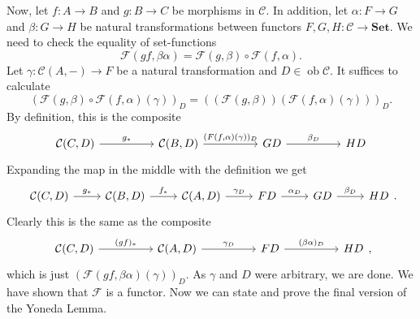 \documentclass{report}
\newcommand{\mbold}[1]{\mathrm{\mathbf{#1}}}
\DeclareMathOperator{\ob}{ob}
\theoremstyle{definition}
\theoremstyle{plain}
\theoremstyle{definition}
\begin{document}
		Now, let $f\colon A \to B$ and $g\colon B \to C$ be morphisms in $\mathcal{C}$. In addition, let $\alpha\colon F \to G$ and $\beta\colon G \to H$ be natural transformations between functors $F,G,H\colon \mathcal{C}\to \mbold{Set}$. We need to check the equality of set-functions
		\[
			\mathscr{F}(gf,\beta\alpha) = \mathscr{F}(g,\beta) \circ \mathscr{F}(f,\alpha). 
		\]
		Let $\gamma\colon \mathcal{C}(A,-) \to F$ be a natural transformation and $D\in\ob\mathcal{C}$. It suffices to calculate 
		\[
			(\mathscr{F}(g,\beta) \circ \mathscr{F}(f,\alpha) (\gamma))_D = ((\mathscr{F}(g,\beta))(\mathscr{F}(f,\alpha) (\gamma)))_D.
		\]
		By definition, this is the composite
		\[\begin{tikzcd}[column sep=huge]
			{\mathcal{C}(C,D)} & {\mathcal{C}(B,D)} & GD & HD
			\arrow["{g_*}", from=1-1, to=1-2]
			\arrow["{(F(f,\alpha)(\gamma))_D}", from=1-2, to=1-3]
			\arrow["{\beta_D}", from=1-3, to=1-4]
		\end{tikzcd}\]
		Expanding the map in the middle with the definition we get
		\[\begin{tikzcd}
			{\mathcal{C}(C,D)} & {\mathcal{C}(B,D)} & {\mathcal{C}(A,D)} & FD & GD & HD
			\arrow["{g_*}", from=1-1, to=1-2]
			\arrow["{\beta_D}", from=1-5, to=1-6]
			\arrow["{f_*}", from=1-2, to=1-3]
			\arrow["{\alpha_D}", from=1-4, to=1-5]
			\arrow["{\gamma_D}", from=1-3, to=1-4]
		\end{tikzcd}.\]
		Clearly this is the same as the composite
		\[\begin{tikzcd}[column sep=huge]
			{\mathcal{C}(C,D)} & {\mathcal{C}(A,D)} & FD & HD
			\arrow["{\gamma_D}", from=1-2, to=1-3]
			\arrow["{(gf)_*}", from=1-1, to=1-2]
			\arrow["{(\beta\alpha)_D}", from=1-3, to=1-4]
		\end{tikzcd},\]
		which is just $(\mathscr{F}(gf,\beta\alpha) (\gamma))_D$. As $\gamma$ and $D$ were arbitrary, we are done. We have shown that $\mathscr{F}$ is a functor. Now we can state and prove the final version of the Yoneda Lemma.
\end{document}

